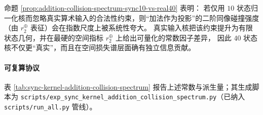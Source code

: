 \begin{remark}
\label{rem:addition-collision-spectrum-interpretation}
命题 \ref{prop:addition-collision-spectrum-sync10-vs-real40} 表明：
若仅用 $10$ 状态归一化核而忽略真实算术输入的合法性约束，则“加法作为投影”的二阶同像碰撞强度（由 \(r_2^{\oplus}\) 表征）会在指数尺度上被系统性夸大。
真实输入核把该约束提升为有限状态几何，并在最硬的空间指标 \(r_2^{\oplus}\) 上给出可量化的常数因子差异，
因此 \(40\) 状态核不仅更“真实”，而且在空间损失谱层面确有独立信息贡献。
\end{remark}

\paragraph{可复算协议}
表 \ref{tab:sync-kernel-addition-collision-spectrum} 报告上述常数与派生量；其生成脚本为
\texttt{scripts/exp\_sync\_kernel\_addition\_collision\_spectrum.py}（已纳入 \texttt{scripts/run\_all.py} 管线）。


